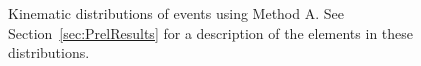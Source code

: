 \documentclass[12pt,twoside,letterpaper,doublespace]{article}
\begin{document}
\clearpage
\begin{figure}[h!]
\centering
\caption[Method A \phoonejet]{Kinematic distributions of \phoonejet events using Method A. See Section~\ref{sec:PrelResults} for a description of the elements in these distributions.}
\subfigure[]

\end{figure}
\end{document}
